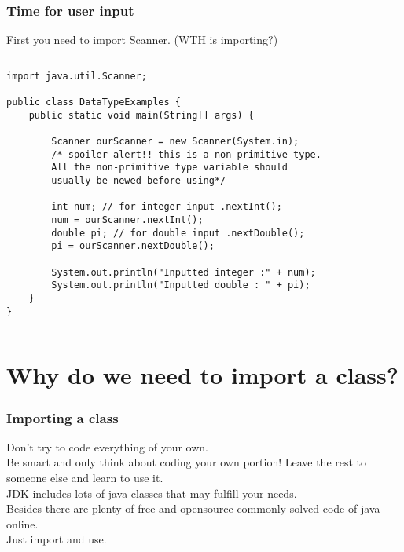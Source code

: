 \documentclass{beamer}
\begin{document}
\begin{frame}[fragile]
\frametitle{Time for user input}
First you need to import Scanner. (WTH is importing?)

\begin{columns}[T]
\begin{column}{\textwidth}
\begin{lstlisting}
import java.util.Scanner;

public class DataTypeExamples {
    public static void main(String[] args) {

        Scanner ourScanner = new Scanner(System.in);
        /* spoiler alert!! this is a non-primitive type.
        All the non-primitive type variable should
        usually be newed before using*/

        int num; // for integer input .nextInt();
        num = ourScanner.nextInt();
        double pi; // for double input .nextDouble();
        pi = ourScanner.nextDouble();

        System.out.println("Inputted integer :" + num);
        System.out.println("Inputted double : " + pi);
    }
}
\end{lstlisting}
\end{column}
\end{columns}
\end{frame}


\section{Why do we need to import a class?}

\begin{frame}[fragile]
\frametitle{Importing a class}
Don't try to code everything of your own.\\
\vspace{0.2in}
Be smart and only think about coding your own portion! Leave the rest to someone else and learn to use it.\\
\vspace{0.2in}
JDK includes lots of java classes that may fulfill your needs.\\
\vspace{0.2in}
Besides there are plenty of free and opensource commonly solved code of java online.\\
\vspace{0.2in}
Just import and use.\\
\vspace{0.2in}
\end{frame}
\end{document}
